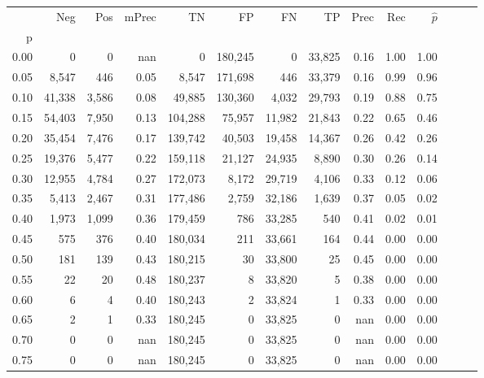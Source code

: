 \begin{tabular}{rrrrrrrrrrrrrr}
\toprule
{} &     Neg &    Pos & mPrec &       TN &       FP &      FN &      TP &  Prec &   Rec & $\hat{p}$ \\
p    &         &        &       &          &          &         &         &       &       &           \\
\midrule
0.00 &       0 &      0 &   nan &        0 &  180,245 &       0 &  33,825 &  0.16 &  1.00 &      1.00 \\
0.05 &   8,547 &    446 &  0.05 &    8,547 &  171,698 &     446 &  33,379 &  0.16 &  0.99 &      0.96 \\
0.10 &  41,338 &  3,586 &  0.08 &   49,885 &  130,360 &   4,032 &  29,793 &  0.19 &  0.88 &      0.75 \\
0.15 &  54,403 &  7,950 &  0.13 &  104,288 &   75,957 &  11,982 &  21,843 &  0.22 &  0.65 &      0.46 \\
0.20 &  35,454 &  7,476 &  0.17 &  139,742 &   40,503 &  19,458 &  14,367 &  0.26 &  0.42 &      0.26 \\
0.25 &  19,376 &  5,477 &  0.22 &  159,118 &   21,127 &  24,935 &   8,890 &  0.30 &  0.26 &      0.14 \\
0.30 &  12,955 &  4,784 &  0.27 &  172,073 &    8,172 &  29,719 &   4,106 &  0.33 &  0.12 &      0.06 \\
0.35 &   5,413 &  2,467 &  0.31 &  177,486 &    2,759 &  32,186 &   1,639 &  0.37 &  0.05 &      0.02 \\
0.40 &   1,973 &  1,099 &  0.36 &  179,459 &      786 &  33,285 &     540 &  0.41 &  0.02 &      0.01 \\
0.45 &     575 &    376 &  0.40 &  180,034 &      211 &  33,661 &     164 &  0.44 &  0.00 &      0.00 \\
0.50 &     181 &    139 &  0.43 &  180,215 &       30 &  33,800 &      25 &  0.45 &  0.00 &      0.00 \\
0.55 &      22 &     20 &  0.48 &  180,237 &        8 &  33,820 &       5 &  0.38 &  0.00 &      0.00 \\
0.60 &       6 &      4 &  0.40 &  180,243 &        2 &  33,824 &       1 &  0.33 &  0.00 &      0.00 \\
0.65 &       2 &      1 &  0.33 &  180,245 &        0 &  33,825 &       0 &   nan &  0.00 &      0.00 \\
0.70 &       0 &      0 &   nan &  180,245 &        0 &  33,825 &       0 &   nan &  0.00 &      0.00 \\
0.75 &       0 &      0 &   nan &  180,245 &        0 &  33,825 &       0 &   nan &  0.00 &      0.00 \\

\end{tabular}
